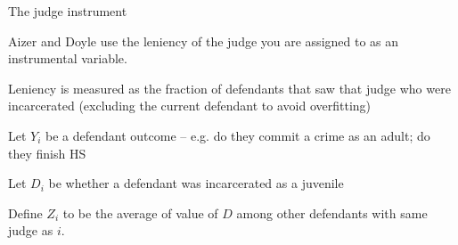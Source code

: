 \documentclass[11pt,english,handout]{beamer}
\newenvironment{wideitemize}{\itemize\addtolength{\itemsep}{10pt}}{\enditemize}
\begin{document}
\begin{frame}{The judge instrument}
	\begin{wideitemize}
		\item
		Aizer and Doyle use the leniency of the judge you are assigned to as an instrumental variable.
		
		\item
		Leniency is measured as the fraction of defendants that saw that judge who were incarcerated (excluding the current defendant to avoid overfitting)
		
		\pause
		\item
		Let $Y_i$ be a defendant outcome -- e.g. do they commit a crime as an adult; do they finish HS
		
		\item
		Let $D_i$ be whether a defendant was incarcerated as a juvenile
		
		\item
		Define $Z_i$ to be the average of value of $D$ among other defendants with same judge as $i$. 
	\end{wideitemize}
\end{frame}
\end{document}
